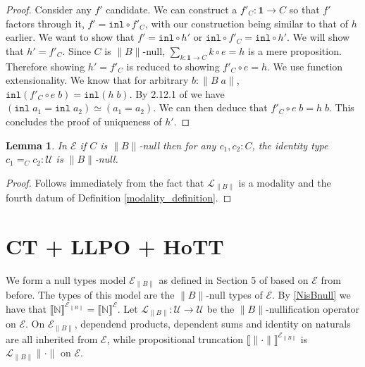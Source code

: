 \documentclass[12pt]{report}
\newtheorem{lem}[thm]{Lemma}
\begin{document}
\begin{proof}
Consider any $f'$ candidate. 
We can construct a $f'_C : \mathbf{1} \rightarrow C$ so that $f'$ factors through it, $f' = \mathtt{inl} \circ f'_C$, with our construction being similar to that of $h$ earlier. 
We want to show that $f' = \mathtt{inl} \circ h'$ or $\mathtt{inl} \circ f'_C = \mathtt{inl} \circ h'$. 
We will show that $h' = f'_C$. 
Since $C$ is $\lVert B \rVert$-null, $\sum_{k : \mathbf{1} \rightarrow C} k \circ e = h$ is a mere proposition. 
Therefore showing $h' = f'_C$ is reduced to showing $f'_C \circ e = h$. 
We use function extensionality. 
We know that for arbitrary $b : \lVert B\; a \rVert$, $\mathtt{inl} (f'_C \circ e\; b ) = \mathtt{inl} (h\; b)$. 
By 2.12.1 of \cite{hottbook} we have $(\mathtt{inl}\; a_1 = \mathtt{inl}\; a_2) \simeq (a_1 = a_2)$. 
We can then deduce that $f'_C\circ e\; b = h\; b$. This concludes the proof of uniqueness of $h'$.

\end{proof}

\begin{lem}
In $\mathcal{E}$ if $C$ is $\lVert B \rVert$-null then for any $c_1, c_2 : C$, the identity type $c_1=_C c_2 : \mathcal{U}$ is $\lVert B\rVert$-null. 
\end{lem}
\begin{proof}
Follows immediately from the fact that $\mathcal{L}_{\lVert B \rVert}$ is a modality and the fourth datum of Definition \ref{modality_definition}.
\end{proof}

\section{CT + LLPO + HoTT}

We form a null types model $\mathcal{E}_{\lVert B \rVert}$ as defined in Section 5 of \cite{1905.03014} based on $\mathcal{E}$ from before. 
The types of this model are the $\lVert B \rVert $-null types of $\mathcal{E}$. 
By \cref{NisBnull} we have that $\llbracket \mathbb{N} \rrbracket^{\mathcal{E}_{\lVert B \rVert}} = \llbracket \mathbb{N} \rrbracket^\mathcal{E}$. 
Let $\mathcal{L}_{\lVert B \rVert} : \mathcal{U} \rightarrow \mathcal{U}$ be the $\lVert B \rVert$-nullification operator on $\mathcal{E}$. 
On $\mathcal{E}_{\lVert B \rVert}$, dependend products, dependent sums and identity on naturals are all inherited from $\mathcal{E}$, while propositional truncation $\llbracket \lVert \cdot \rVert \rrbracket^{\mathcal{E}_{\lVert B \rVert}}$ is $\mathcal{L}_{\lVert B \rVert} \lVert\cdot \rVert $ on $\mathcal{E}$.
\end{document}
